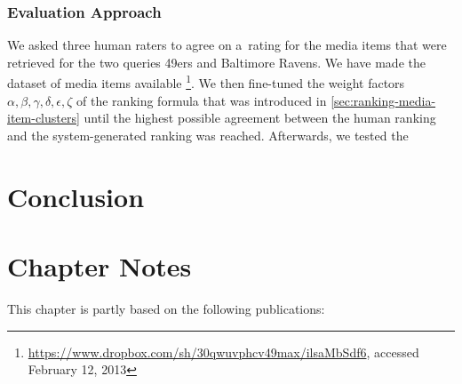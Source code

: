 \subsubsection{Evaluation Approach}

We asked three human raters to agree on a~rating for the media items
that were retrieved for the two queries 49ers and Baltimore Ravens.
We have made the dataset of media items available%
\footnote{\url{https://www.dropbox.com/sh/30qwuvphcv49max/ilsaMbSdf6},
accessed February 12, 2013}.
We then fine-tuned the weight factors $ \alpha, \beta, \gamma, \delta, \epsilon, \zeta $ of the ranking formula
that was introduced in \autoref{sec:ranking-media-item-clusters}
until the highest possible agreement between the human ranking
and the system-generated ranking was reached.
Afterwards, we tested the 

\section{Conclusion}

\section*{Chapter Notes}
This chapter is partly based on the following publications:
